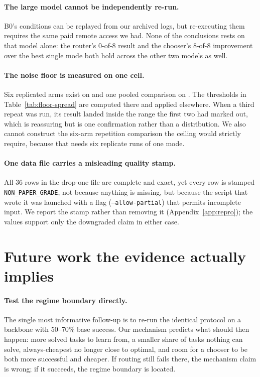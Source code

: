 \paragraph{The large model cannot be independently re-run.} B0's conditions
can be replayed from our archived logs, but re-executing them requires the
same paid remote access we had. None of the conclusions rests on that model
alone: the router's 0-of-8 result and the chooser's 8-of-8 improvement over
the best single mode both hold across the other two models as well.

\paragraph{The noise floor is measured on one cell.} Six replicated arms exist
on  and one pooled comparison on . The
thresholds in Table~\ref{tab:floor-spread} are computed there and applied
elsewhere. When a third repeat was run, its result landed inside the range the
first two had marked out, which is reassuring but is one confirmation rather than a
distribution. We also cannot construct the six-arm repetition comparison the
ceiling would strictly require, because that needs six replicate runs of one
mode.

\paragraph{One data file carries a misleading quality stamp.} All 36 rows in
the drop-one file are complete and exact, yet every row is stamped
\texttt{NON\_PAPER\_GRADE}, not because anything is missing, but because
the script that wrote it was launched with a flag (\texttt{--allow-partial})
that permits incomplete input. We report the stamp rather than removing it
(Appendix~\ref{app:repro}); the values support only the downgraded claim in
either case.

\section{Future work the evidence actually implies}
\label{sec:future}

\paragraph{Test the regime boundary directly.} The single most informative
follow-up is to re-run the identical protocol on a backbone with 50--70\% base
success. Our mechanism predicts what should then happen: more solved tasks to
learn from, a smaller share of tasks nothing can solve, always-cheapest no
longer close to optimal, and room for a chooser to be both more successful and
cheaper.
If routing still fails there, the mechanism claim is wrong; if it succeeds, the
regime boundary is located.

